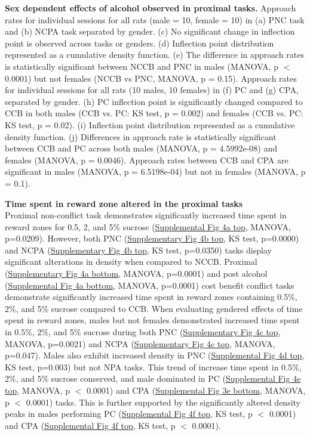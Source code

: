 \documentclass{article}
\begin{document}
\captionsetup{type=figure}
\caption{\textbf{Sex dependent effects of alcohol observed in proximal tasks.} Approach rates for individual sessions for all rats (male = 10, female = 10) in (a) PNC task and (b) NCPA task separated by gender. (c) No significant change in inflection point is observed across tasks or genders. (d) Inflection point distribution represented as a cumulative density function. (e) The difference in approach rates is statistically significant between NCCB and PNC in males (MANOVA, p $<$ 0.0001) but not females (NCCB vs PNC, MANOVA, p = 0.15). Approach rates for individual sessions for all rats (10 males, 10 females) in (f) PC and (g) CPA, separated by gender. (h) PC inflection point is significantly changed compared to CCB in both males (CCB vs. PC: KS test, p = 0.002) and females (CCB vs. PC: KS test, p = 0.02). (i) Inflection point distribution represented as a cumulative density function. (j) Differences in approach rate is statistically significant between CCB and PC across both males (MANOVA, p = 4.5992e-08) and females (MANOVA, p = 0.0046). Approach rates between CCB and CPA are significant in males (MANOVA, p = 6.5198e-04) but not in females (MANOVA, p = 0.1).}
\label{fig:alcohol_main_5}

\vspace{1em}

\noindent\textbf{Time spent in reward zone altered in the proximal tasks}\\
Proximal non-conflict task demonstrates significantly increased time spent in reward zones for 0.5, 2, and 5\% sucrose (\hyperref[fig:Alcohol_SI_4]{Supplemental Fig 4a top}, MANOVA, p=0.0209). However, both PNC (\hyperref[fig:Alcohol_SI_4]{Supplementary Fig 4b top}, KS test, p=0.0000) and NCPA (\hyperref[fig:Alcohol_SI_4]{Supplementary Fig 4b top}, KS test, p=0.0350) tasks display significant alterations in density when compared to NCCB. Proximal (\hyperref[fig:Alcohol_SI_4]{Supplementary Fig 4a bottom}, MANOVA, p=0.0001) and post alcohol (\hyperref[fig:Alcohol_SI_4]{Supplemental Fig 4a bottom}, MANOVA, p=0.0001) cost benefit conflict tasks demonstrate significantly increased time spent in reward zones containing 0.5\%, 2\%, and 5\% sucrose compared to CCB. When evaluating gendered effects of time spent in reward zones, males but not females demonstrated increased time spent in 0.5\%, 2\%, and 5\% sucrose during both PNC (\hyperref[fig:Alcohol_SI_4]{Supplementary Fig 4c top}, MANOVA, p=0.0021) and NCPA (\hyperref[fig:Alcohol_SI_4]{Supplementary Fig 4c top}, MANOVA, p=0.047). Males also exhibit increased density in PNC (\hyperref[fig:Alcohol_SI_4]{Supplemental Fig 4d top}, KS test, p=0.003) but not NPA tasks. This trend of increase time spent in 0.5\%, 2\%, and 5\% sucrose conserved, and male dominated in PC (\hyperref[fig:Alcohol_SI_4]{Supplemental Fig 4e top}, MANOVA, p $<$ 0.0001) and CPA (\hyperref[fig:Alcohol_SI_4]{Supplemental Fig 3e bottom}, MANOVA, p $<$ 0.0001) tasks. This is further supported by the significantly altered density peaks in males performing PC (\hyperref[fig:Alcohol_SI_4]{Supplemental Fig 4f top}, KS test, p $<$ 0.0001) and CPA (\hyperref[fig:Alcohol_SI_4]{Supplemental Fig 4f top}, KS test, p $<$ 0.0001).
\end{document}
